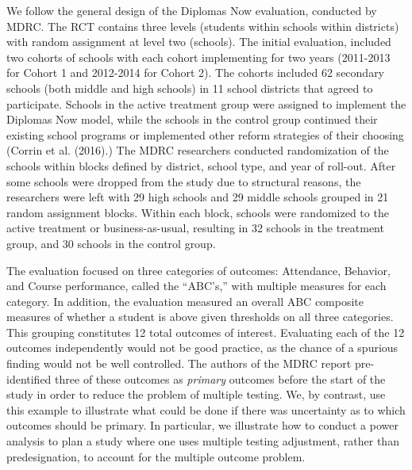 \documentclass{article}
\begin{document}
We follow the general design of the Diplomas Now evaluation, conducted
by MDRC. The RCT contains three levels (students within schools within
districts) with random assignment at level two (schools). The initial
evaluation, included two cohorts of schools with each cohort
implementing for two years (2011-2013 for Cohort 1 and 2012-2014 for
Cohort 2). The cohorts included 62 secondary schools (both middle and
high schools) in 11 school districts that agreed to participate. Schools
in the active treatment group were assigned to implement the Diplomas
Now model, while the schools in the control group continued their
existing school programs or implemented other reform strategies of their
choosing (Corrin et al. (2016).) The MDRC researchers conducted
randomization of the schools within blocks defined by district, school
type, and year of roll-out. After some schools were dropped from the
study due to structural reasons, the researchers were left with 29 high
schools and 29 middle schools grouped in 21 random assignment blocks.
Within each block, schools were randomized to the active treatment or
business-as-usual, resulting in 32 schools in the treatment group, and
30 schools in the control group.

The evaluation focused on three categories of outcomes: Attendance,
Behavior, and Course performance, called the ``ABC's,'' with multiple
measures for each category. In addition, the evaluation measured an
overall ABC composite measures of whether a student is above given
thresholds on all three categories. This grouping constitutes 12 total
outcomes of interest. Evaluating each of the 12 outcomes independently
would not be good practice, as the chance of a spurious finding would
not be well controlled. The authors of the MDRC report pre-identified
three of these outcomes as \emph{primary} outcomes before the start of
the study in order to reduce the problem of multiple testing. We, by
contrast, use this example to illustrate what could be done if there was
uncertainty as to which outcomes should be primary. In particular, we
illustrate how to conduct a power analysis to plan a study where one
uses multiple testing adjustment, rather than predesignation, to account
for the multiple outcome problem.
\end{document}
